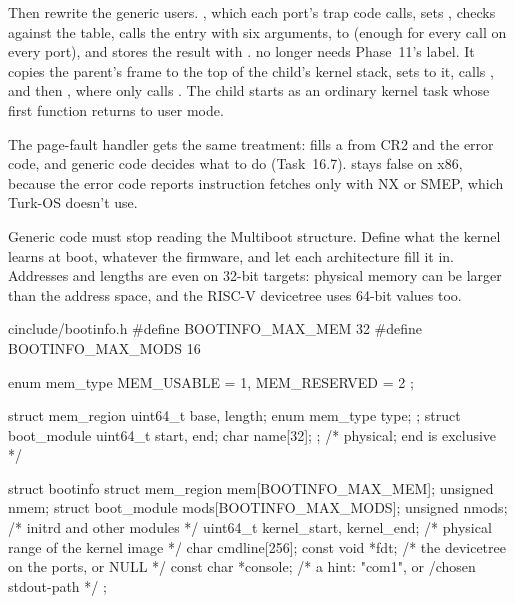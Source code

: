 \documentclass[11pt,a4paper]{article}
\begin{document}
Then rewrite the generic users. , which each port's trap code calls, sets
, checks  against the table, calls the entry with six 
arguments,  to  (enough for every call on every port), and stores the result
with .  no longer needs Phase~11's  label. It copies the parent's frame to
the top of the child's kernel stack, sets  to it, calls , and then
, where  only calls
. The child starts as an ordinary kernel task whose first function returns to user mode.

The page-fault handler gets the same treatment:  fills a  from CR2 and
the error code, and generic code decides what to do (Task~16.7).  stays false on x86, because the error
code reports instruction fetches only with NX or SMEP, which Turk-OS doesn't use.

Generic code must stop reading the Multiboot structure. Define what the kernel learns at boot, whatever the firmware,
and let each architecture fill it in. Addresses and lengths are  even on 32-bit targets: physical
memory can be larger than the address space, and the RISC-V devicetree uses 64-bit values too.

\begin{lst}{c}{include/bootinfo.h}
#define BOOTINFO_MAX_MEM  32
#define BOOTINFO_MAX_MODS 16

enum mem_type { MEM_USABLE = 1, MEM_RESERVED = 2 };

struct mem_region  { uint64_t base, length; enum mem_type type; };
struct boot_module { uint64_t start, end; char name[32]; };  /* physical; end is exclusive */

struct bootinfo {
    struct mem_region  mem[BOOTINFO_MAX_MEM];   unsigned nmem;
    struct boot_module mods[BOOTINFO_MAX_MODS]; unsigned nmods;   /* initrd and other modules */
    uint64_t           kernel_start, kernel_end;    /* physical range of the kernel image   */
    char               cmdline[256];
    const void        *fdt;                         /* the devicetree on the ports, or NULL */
    const char        *console;                     /* a hint: "com1", or /chosen stdout-path */
};
\end{lst}
\end{document}
